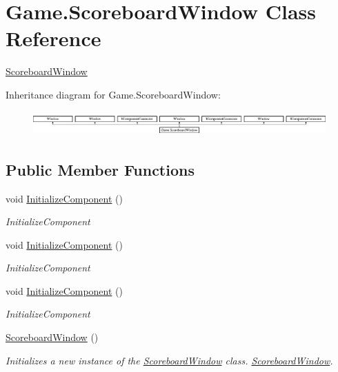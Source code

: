 \hypertarget{class_game_1_1_scoreboard_window}{}\section{Game.\+Scoreboard\+Window Class Reference}
\label{class_game_1_1_scoreboard_window}


\mbox{\hyperlink{class_game_1_1_scoreboard_window}{Scoreboard\+Window}}  


Inheritance diagram for Game.\+Scoreboard\+Window\+:\begin{figure}[H]
\begin{center}
\leavevmode
\includegraphics[height=0.958084cm]{class_game_1_1_scoreboard_window}
\end{center}
\end{figure}
\subsection*{Public Member Functions}
\begin{DoxyCompactItemize}
\item 
void \mbox{\hyperlink{class_game_1_1_scoreboard_window_a6579ede7390dda7349bb34ee46a917d7}{Initialize\+Component}} ()
\begin{DoxyCompactList}\small\item\em Initialize\+Component \end{DoxyCompactList}\item 
void \mbox{\hyperlink{class_game_1_1_scoreboard_window_a6579ede7390dda7349bb34ee46a917d7}{Initialize\+Component}} ()
\begin{DoxyCompactList}\small\item\em Initialize\+Component \end{DoxyCompactList}\item 
void \mbox{\hyperlink{class_game_1_1_scoreboard_window_a6579ede7390dda7349bb34ee46a917d7}{Initialize\+Component}} ()
\begin{DoxyCompactList}\small\item\em Initialize\+Component \end{DoxyCompactList}\item 
\mbox{\hyperlink{class_game_1_1_scoreboard_window_addded69df55ff58a3160d2b5ad217826}{Scoreboard\+Window}} ()
\begin{DoxyCompactList}\small\item\em Initializes a new instance of the \mbox{\hyperlink{class_game_1_1_scoreboard_window}{Scoreboard\+Window}} class. \mbox{\hyperlink{class_game_1_1_scoreboard_window}{Scoreboard\+Window}}. \end{DoxyCompactList}\end{DoxyCompactItemize}


